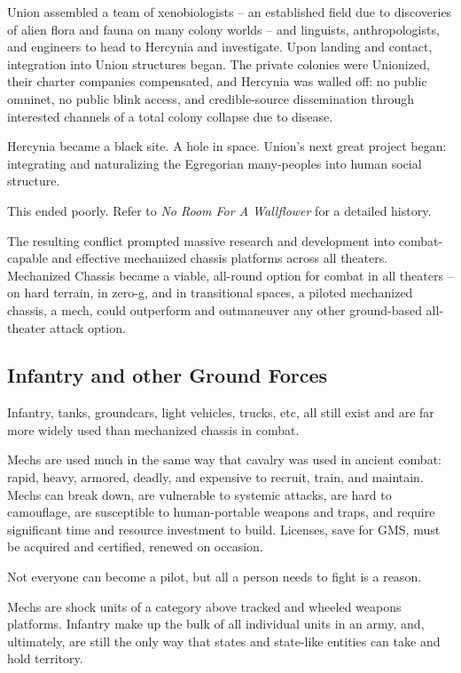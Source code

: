 Union assembled a team of xenobiologists -- an established field due to discoveries of alien flora
and fauna on many colony worlds -- and linguists, anthropologists, and engineers to head to
Hercynia and investigate. Upon landing and contact, integration into Union structures began. The
private colonies were Unionized, their charter companies compensated, and Hercynia was
walled off: no public omninet, no public blink access, and credible-source dissemination through
interested channels of a total colony collapse due to disease.

Hercynia became a black site. A hole in space. Union's next great project began: integrating and
naturalizing the Egregorian many-peoples into human social structure.

This ended poorly. Refer to \textit{No Room For A Wallflower} for a detailed history.

The resulting conflict prompted massive research and development into combat-capable and
effective mechanized chassis platforms across all theaters. Mechanized Chassis became a
viable, all-round option for combat in all theaters -- on hard terrain, in zero-g, and in transitional
spaces, a piloted mechanized chassis, a mech, could outperform and outmaneuver any other
ground-based all-theater attack option.

\subsection{Infantry and other Ground Forces}

Infantry, tanks, groundcars, light vehicles, trucks, etc, all still exist and are far more widely used
than mechanized chassis in combat.

Mechs are used much in the same way that cavalry was used in ancient combat: rapid, heavy,
armored, deadly, and expensive to recruit, train, and maintain. Mechs can break down, are
vulnerable to systemic attacks, are hard to camouflage, are susceptible to human-portable
weapons and traps, and require significant time and resource investment to build. Licenses, save
for GMS, must be acquired and certified, renewed on occasion.

Not everyone can become a pilot, but all a person needs to fight is a reason.

Mechs are shock units of a category above tracked and wheeled weapons platforms. Infantry
make up the bulk of all individual units in an army, and, ultimately, are still the only way that
states and state-like entities can take and hold territory.

